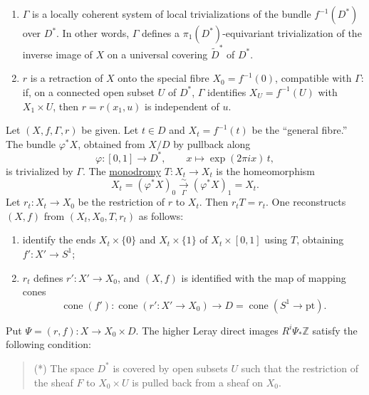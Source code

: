 \begin{enumerate}[label=(\alph*),leftmargin=2.6em]
\item $\Gamma$ is a locally coherent system of local trivializations of
the bundle $f^{-1}(D^*)$ over $D^*$.  In other words, $\Gamma$ defines a
$\pi_1(D^*)$-equivariant trivialization of the inverse image of $X$ on a
universal covering $\widetilde D^*$ of $D^*$.

\item $r$ is a retraction of $X$ onto the special fibre
$X_0=f^{-1}(0)$, compatible with $\Gamma$: if, on a connected open
subset $U$ of $D^*$, $\Gamma$ identifies
$X_U=f^{-1}(U)$ with $X_1\times U$, then $r=r(x_1,u)$ is independent of
$u$.
\end{enumerate}

Let $(X,f,\Gamma,r)$ be given.  Let $t\in D$ and
$X_t=f^{-1}(t)$ be the ``general fibre.''  The bundle $\varphi^*X$,
obtained from $X/D$ by pullback along
\begin{equation*}
\varphi:[0,1]\longrightarrow D^*,
\qquad x\longmapsto \exp(2\pi i x)\,t,
\end{equation*}
is trivialized by $\Gamma$.  The \underline{monodromy}
$T:X_t\longrightarrow X_t$ is the homeomorphism
\begin{equation*}
X_t=(\varphi^*X)_0\xrightarrow[\Gamma]{\sim}
(\varphi^*X)_1=X_t.
\end{equation*}
Let $r_t:X_t\longrightarrow X_0$ be the restriction of $r$ to $X_t$.
Then $r_tT=r_t$.  One reconstructs $(X,f)$ from
$(X_t,X_0,T,r_t)$ as follows:
\begin{enumerate}[label=(\alph*),leftmargin=2.6em]
\item identify the ends $X_t\times\{0\}$ and $X_t\times\{1\}$ of
$X_t\times[0,1]$ using $T$, obtaining $f':X'\longrightarrow S^1$;
\item $r_t$ defines $r':X'\longrightarrow X_0$, and $(X,f)$ is
identified with the map of mapping cones
\begin{equation*}
\operatorname{cone}(f'):
\operatorname{cone}(r':X'\longrightarrow X_0)
\longrightarrow D=\operatorname{cone}(S^1\longrightarrow\mathrm{pt}).
\end{equation*}
\end{enumerate}


Put $\Psi=(r,f):X\longrightarrow X_0\times D$.  The higher Leray direct
images $R^i\Psi_*\mathbb Z$ satisfy the following condition:

\begin{quote}
(*) The space $D^*$ is covered by open subsets $U$ such that the
restriction of the sheaf $F$ to $X_0\times U$ is pulled back from a sheaf
on $X_0$.
\end{quote}

